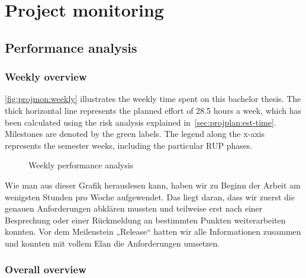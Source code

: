 \chapter{Project monitoring}
\section{Performance analysis}
\subsection{Weekly overview}

\autoref{fig:projmon:weekly} illustrates the weekly time spent on this bachelor
thesis. The thick horizontal line represents the planned effort of 28.5 hours a
week, which has been calculated using the risk analysis explained
in~\autoref{sec:projplan:est-time}.  Milestones are denoted by the green
labels. The legend along the x-axis represents the semester weeks, including
the particular RUP phases.


\begin{figure}
	\caption{Weekly performance analysis}
	\label{fig:projmon:weekly}
\end{figure}

Wie man aus dieser Grafik herauslesen kann, haben wir zu Beginn der Arbeit 
am wenigsten Stunden pro Woche aufgewendet. Das liegt daran, dass wir zuerst die 
genauen Anforderungen abklären mussten und teilweise erst nach einer Besprechung 
oder einer Rückmeldung an bestimmten Punkten weiterarbeiten konnten. 
Vor dem Meilenstein „Release“ hatten wir alle Informationen zusammen und 
konnten mit vollem Elan die Anforderungen umsetzen.

\subsection{Overall overview}

